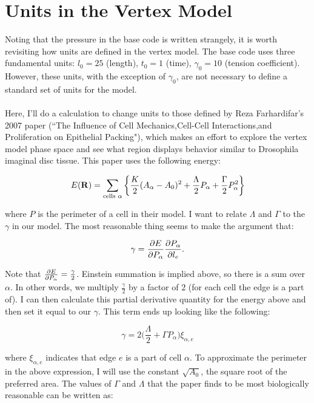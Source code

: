 \documentclass[12pt]{article}
\begin{document}
\section{Units in the Vertex Model}
Noting that the pressure in the base code is written strangely, it is worth revisiting how units are defined in the vertex model. The base code uses three fundamental units: $l_0 = 25$ (length), $t_0 = 1$ (time), $\gamma_0 = 10$ (tension coefficient). However, these units, with the exception of $\gamma_0$, are not necessary to define a standard set of units for the model. \\ \\
Here, I'll do a calculation to change units to those defined by Reza Farhardifar's 2007 paper (``The Influence of Cell Mechanics,Cell-Cell Interactions,and Proliferation on Epithelial Packing"), which makes an effort to explore the vertex model phase space and see what region displays behavior similar to Drosophila imaginal disc tissue. This paper uses the following energy:
\begin{center}
\begin{equation}
E(\vb{R}) = \sum\limits_{\text{cells }\alpha} \bigg\{\frac{K}{2}(A_\alpha - A_0)^2 + \frac{\Lambda}{2} P_\alpha + \frac{\Gamma}{2} P_\alpha^2 \bigg\}
\end{equation}
\end{center}
where $P$ is the perimeter of a cell in their model. I want to relate $\Lambda$ and $\Gamma$ to the $\gamma$ in our model. The most reasonable thing seems to make the argument that:
\begin{center}
\begin{equation}
\gamma = \pdv{E}{P_\alpha}\pdv{P_\alpha}{l_e} .
\end{equation}
\end{center}
Note that $\pdv{E}{P_\alpha} = \frac{\gamma}{2}$. Einstein summation is implied above, so there is a sum over $\alpha$. In other words, we multiply $\frac{\gamma}{2}$ by a factor of $2$ (for each cell the edge is a part of). I can then calculate this partial derivative quantity for the energy above and then set it equal to our $\gamma$. This term ends up looking like the following:
\begin{center}
\begin{equation}
\label{gamma def}
\gamma = 2 \bigg(\frac{\Lambda}{2} + \Gamma P_\alpha\bigg) \xi_{\alpha, e}
\end{equation}
\end{center}
where $\xi_{\alpha,e}$ indicates that edge $e$ is a part of cell $\alpha$. To approximate the perimeter in the above expression, I will use the constant $\sqrt{A_0}$, the square root of the preferred area. The values of $\Gamma$ and $\Lambda$ that the paper finds to be most biologically reasonable can be written as:
\end{document}
